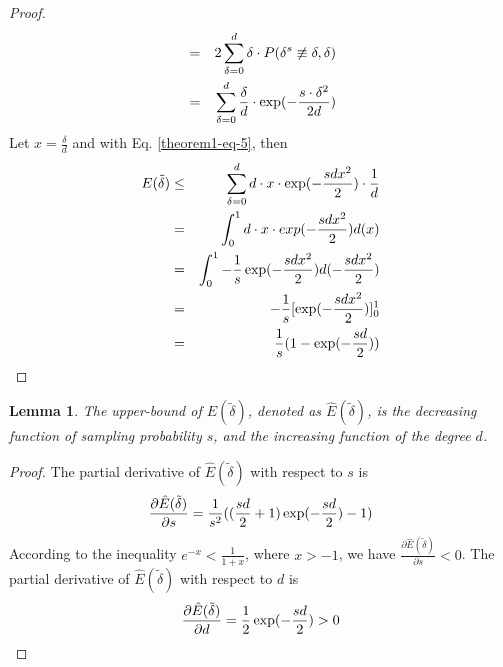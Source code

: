 \documentclass{sig-alternate-2013}
\begin{document}
\begin{proof}
\begin{eqnarray}
&=& 2\sum_{\delta=0}^{d} {\delta \cdot P( \delta^s \not\equiv \delta, \delta) } \notag \\
&=& \sum_{\delta=0}^{d} { \frac{\delta}{d} \cdot \exp(-\frac{s\cdot \delta^2}{2d})}
\end{eqnarray}
Let $x=\frac{\delta}{d}$ and with Eq. \eqref{theorem1-eq-5}, then
\begin{eqnarray}
E(\tilde\delta) &\leq& \sum_{\delta=0}^{d} {d\cdot x\cdot \exp(-\frac{s d x^2}{2})\cdot \frac{1}{d}} \notag\\
&=& \int_0^{1} {d \cdot x \cdot exp(-\frac{s d x^2}{2})} d(x)\notag \\
&=& \int_0^{1} {-\frac{1}{s} \exp(-\frac{s d x^2}{2})d(-\frac{s d x^2}{2})} \notag \\
&=& -\frac{1}{s} [\exp(-\frac{s d x^2}{2})]_0^{1} \notag \\
&=& \frac{1}{s} (1-\exp(-\frac{s d}{2})) \notag
\end{eqnarray}
\end{proof}

\newtheorem{lemma}{Lemma}
\begin{lemma}\label{lemma-partitioning-error-func-property}
The upper-bound of $E(\tilde\delta)$, denoted as $\hat{E}(\tilde\delta)$, is the decreasing function of sampling probability $s$, and the increasing function of the degree $d$.
\end{lemma}
\begin{proof}
The partial derivative of $\hat{E}(\tilde\delta)$ with respect to $s$ is
\begin{eqnarray}
\frac{\partial \hat{E}(\tilde\delta)}{\partial s} = \frac{1}{s^2}((\frac{sd}{2} + 1)\exp(-\frac{sd}{2})-1) \notag
\end{eqnarray}
According to the inequality $e^{-x} < \frac{1}{1+x}$, where $x>-1$, we have $\frac{\partial \hat{E}(\tilde\delta) }{\partial s} < 0$.
The partial derivative of $\hat{E}(\tilde\delta)$ with respect to $d$ is
\begin{eqnarray}
\frac{\partial \hat{E}(\tilde\delta) }{\partial d} = \frac{1}{2}\exp(-\frac{sd}{2}) > 0 \notag
\end{eqnarray}
\end{proof}
\end{document}
